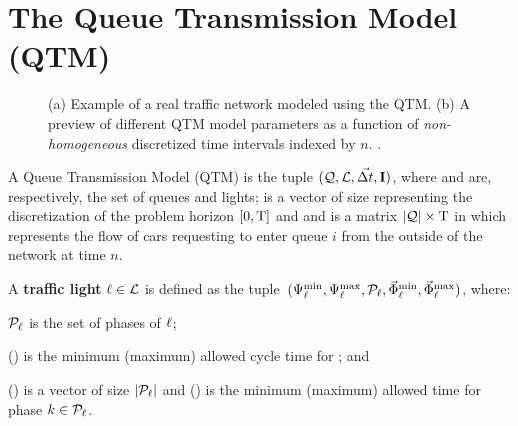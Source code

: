 \section{The Queue Transmission Model (QTM)}


\begin{figure}[t]
\centering
\caption{(a) Example of a real traffic network modeled using the
  QTM. (b) A preview of different QTM model parameters as a function
  of \emph{non-homogeneous} discretized time intervals indexed by $n$.
  .}
\label{fig:qtm}
%
\end{figure}



A Queue Transmission Model (QTM) is the tuple $(\mathcal{Q}, \mathcal{L}, \vec{\Delta t}, \mathbf{I})$,
where \Qset and \Lset are, respectively, the set of queues and lights;
%
\vecDT is a vector of size \Nn representing the discretization of the problem
horizon $[0,\mathrm{T}]$ and 
%
%
and \MatQIN is a matrix $|\mathcal{Q}| \times \mathrm{T}$ in which  represents
the flow of cars requesting to enter queue $i$ from the outside of the network
at time $n$.



A \textbf{traffic light} $\ell \in \mathcal{L}$ is defined as the tuple~$(\mathrm{\Psi}_{\ell}^{\mathrm{min}},
\mathrm{\Psi}_{\ell}^{\mathrm{max}}, \mathcal{P}_\ell, \vec{\mathrm{\Phi}}_{\ell}^{\mathrm{min}}, \vec{\mathrm{\Phi}}_{\ell}^{\mathrm{max}})$, where:
%
\begin{itemize*}[label={}]
%
\item $\mathcal{P}_\ell$ is the set of phases of $\ell$;
%
\item \CTMIN{\tl} (\CTMAX{\tl}) is the minimum (maximum) allowed cycle time for
\tl; and
%
\item \VecPTMIN{\tl} (\VecPTMAX{\tl}) is a vector of size $|\mathcal{P}_\ell|$ and
   () is the minimum (maximum) allowed time for
  phase $k \in \mathcal{P}_\ell$. 
%
\end{itemize*}


